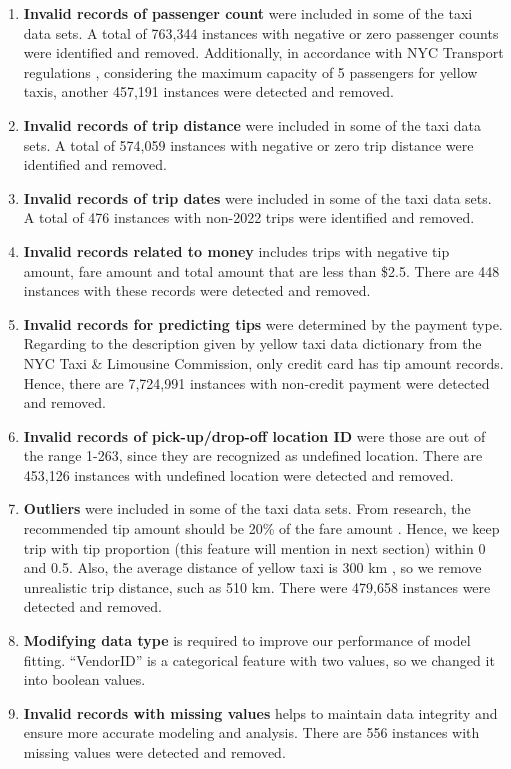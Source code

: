 \documentclass[11pt]{article}
\begin{document}
\begin{enumerate} 
    \item \textbf{Invalid records of passenger count} were included in some of the taxi data sets. A total of 763,344 instances with negative or zero passenger counts were identified and removed. Additionally, in accordance with NYC Transport regulations \cite{passenger}, considering the maximum capacity of 5 passengers for yellow taxis, another 457,191 instances were detected and removed.
    \item \textbf{Invalid records of trip distance} were included in some of the taxi data sets. A total of 574,059 instances with negative or zero trip distance were identified and removed.
    \item \textbf{Invalid records of trip dates} were included in some of the taxi data sets. A total of 476 instances with non-2022 trips were identified and removed.
    \item \textbf{Invalid records related to money} includes trips with negative tip amount, fare amount and total amount that are less than \$2.5. There are 448 instances with these records were detected and removed.
    \item \textbf{Invalid records for predicting tips} were determined by the payment type. Regarding to the description given by yellow taxi data dictionary from the NYC Taxi \& Limousine Commission, only credit card has tip amount records. Hence, there are 7,724,991 instances with non-credit payment were detected and removed.
    \item \textbf{Invalid records of pick-up/drop-off location ID} were those are out of the range 1-263, since they are recognized as undefined location. There are 453,126 instances with undefined location were detected and removed.
    \item \textbf{Outliers} were included in some of the taxi data sets. From research, the recommended tip amount should be 20\% of the fare amount \cite{tips}. Hence, we keep trip with tip proportion (this feature will mention in next section) within 0 and 0.5. Also, the average distance of yellow taxi is 300 km \cite{taxi}, so we remove unrealistic trip distance, such as 510 km. There were 479,658 instances were detected and removed.
    \item \textbf{Modifying data type} is required to improve our performance of model fitting. ``VendorID'' is a categorical feature with two values, so we changed it into boolean values. 
    \item \textbf{Invalid records with missing values} helps to maintain data integrity and ensure more accurate modeling and analysis. There are 556 instances with missing values were detected and removed.
\end{enumerate}
\end{document}
